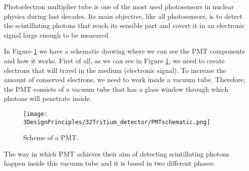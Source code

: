 Photoelectron multiplier tube is one of the most used photosensors in nuclear physics during last decades. Its main objective, like all photosensors, is to detect the scintillating photons that reach its sensible part and covert it in an electronic signal large enough to be measured. 

In Figure \ref{fig:SchemePMT} we have a schematic drawing where we can see the PMT components and how it works. First of all, as we can see in Figure \ref{fig:SchemePMT}, we need to create electrons that will travel in the medium (electronic signal). To increase the amount of conserved electrons, we need to work inside a vacuum tube. Therefore, the PMT consists of a vacuum tube that has a glass window through which photons will penetrate inside. 

\begin{figure}[htbp]
\centering
\texttt{[image: 3DesignPrinciples/32Tritium\_detector/PMTschematic.png]}
\caption{Scheme of a PMT.\label{fig:SchemePMT}~\cite{Knoll}}
\end{figure}

The way in which PMT achieves their aim of detecting scintillating photons happen inside this vacuum tube and it is based in two different phases:

